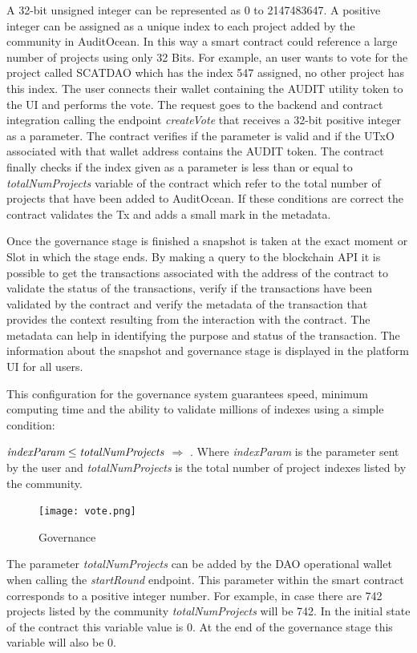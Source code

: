 \documentclass[9pt]{article}
\begin{document}
A 32-bit unsigned integer can be represented as 0 to 2147483647. A positive integer can be assigned as a unique index to each project added by the community in AuditOcean. In this way a smart contract could reference a large number of projects using only 32 Bits. For example, an user wants to vote for the project called SCATDAO which has the index 547 assigned, no other project has this index. The user connects their wallet containing the AUDIT utility token to the UI and performs the vote. The request goes to the backend and contract integration calling the endpoint \emph{createVote} that receives a 32-bit positive integer as a parameter. The contract verifies if the parameter is valid and if the UTxO associated with that wallet address contains the AUDIT token. The contract finally checks if the index given as a parameter is less than or equal to \emph{totalNumProjects} variable of the contract which refer to the total number of projects that have been added to AuditOcean. If these conditions are correct the contract validates the Tx and adds a small mark in the metadata.


Once the governance stage is finished a snapshot is taken at the exact moment or Slot in which the stage ends. By making a query to the blockchain API it is possible to get the transactions associated with the address of the contract to validate the status of the transactions, verify if the transactions have been validated by the contract and verify the metadata of the transaction that provides the context resulting from the interaction with the contract. The metadata can help in identifying the purpose and status of the transaction. The information about the snapshot and governance stage is displayed in the platform UI for all users.

This configuration for the governance system guarantees speed, minimum computing time and the ability to validate millions of indexes using a simple condition:

$\emph{indexParam} \leq \emph{totalNumProjects}$  $\Rightarrow$ . Where \emph{indexParam} is the parameter sent by the user and \emph{totalNumProjects} is the total number of project indexes listed by the community.

\begin{figure}[ht]
  \centering
  \texttt{[image: vote.png]}
  \caption{Governance
  }
  \label{fig:mi_imagen}
\end{figure}

The parameter \emph{totalNumProjects} can be added by the DAO operational wallet when calling the \emph{startRound} endpoint. This parameter within the smart contract corresponds to a positive integer number. For example, in case there are 742 projects listed by the community \emph{totalNumProjects} will be 742. In the initial state of the contract this variable value is 0. At the end of the governance stage this variable will also be 0.
\end{document}
